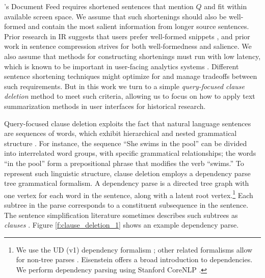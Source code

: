 \ours's Document Feed requires shortened sentences that mention $Q$ and fit within available screen space.
We assume that such shortenings should also be well-formed and contain the most salient information from longer source sentences. 
Prior research in IR suggests that users prefer well-formed snippets \cite{ryenwhitesnippets}, and prior work in sentence compression \cite{Knight2000StatisticsBasedS,filippova-altun-2013-overcoming, filippova2015sentence} strives for both well-formedness and salience.
We also assume that methods for constructing shortenings must run with low latency, which is known to be important in user-facing analytics systems \cite{latencyliu}.
Different sentence shortening techniques might optimize for and manage tradeoffs between such requirements. 
But in this work we turn to a simple \textit{query-focused clause deletion} method to meet such criteria, allowing us to focus on how to apply text summarization methods in user interfaces for historical research.

Query-focused clause deletion exploits the fact that natural language sentences are sequences of words, which exhibit hierarchical and nested grammatical structure \cite{bender_linguistic_2013}.
For instance, the sequence ``She swims in the pool'' can be divided into interrelated word groups, with specific grammatical relationships; the words ``in the pool'' form a prepositional phrase that modifies the verb ``swims.''
To represent such linguistic structure, clause deletion employs a dependency parse tree \cite{Nivre2016UniversalDV} grammatical formalism.
A dependency parse is a directed tree graph with one vertex for each word in the sentence, along with a latent root vertex.\footnote{We use the UD (v1) dependency formalism \cite{Nivre2016UniversalDV}; other related formalisms allow for non-tree parses \cite{schuster-manning-2016-enhanced}. Eisenstein \cite[Chapter 11]{eisenstein2019introduction} offers a broad introduction to dependencies. We perform dependency parsing using Stanford CoreNLP \cite{corenlppipeline,chen-manning-2014-fast}.}
Each subtree in the parse corresponds to a constituent subsequence in the sentence. 
The sentence simplification literature sometimes describes such subtrees as \textit{clauses} \cite{filippova-strube-2008-dependency}.
Figure \ref{f:clause_deletion_1} shows an example dependency parse.

